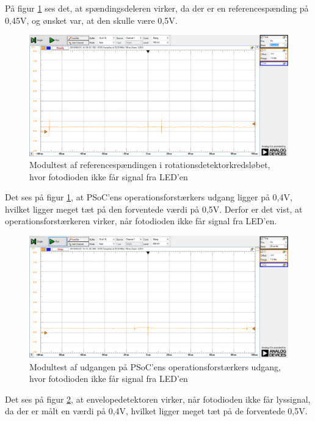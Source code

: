 \noindent På figur \ref{fig:spaendIkkeSe} ses det, at spændingsdeleren virker, da der er en referencespænding på 0,45V, og ønsket var, at den skulle være 0,5V. 

\begin{figure}[H]
	\centering
	\includegraphics[width=\textwidth]{Test/images/AffyringTest/IkkeSe/spaendingsdeler}
	\caption{Modultest af referencespændingen i rotationsdetektorkredsløbet, hvor fotodioden ikke får signal fra LED'en}
	\label{fig:spaendIkkeSe}
\end{figure}

\noindent Det ses på figur \ref{fig:spaendIkkeSe}, at PSoC'ens operationsforstærkers udgang ligger på 0,4V, hvilket ligger meget tæt på den forventede værdi på 0,5V. Derfor er det vist, at operationsforstærkeren virker, når fotodioden ikke får signal fra LED'en. 

\begin{figure}[H]
	\centering
	\includegraphics[width=\textwidth]{Test/images/AffyringTest/IkkeSe/udgang_opamp_psoc}
	\caption{Modultest af udgangen på PSoC'ens operationsforstærkers udgang, hvor fotodioden ikke får signal fra LED'en}
	\label{fig:udgangOpAmpIkkeSe}
\end{figure}

\noindent Det ses på figur \ref{fig:udgangOpAmpIkkeSe}, at envelopedetektoren virker, når fotodioden ikke får lyssignal, da der er målt en værdi på 0,4V, hvilket ligger meget tæt på de forventede 0,5V. 

